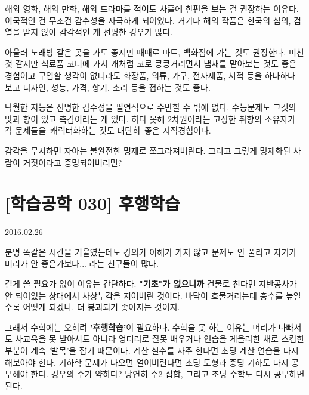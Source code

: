 해외 영화, 해외 만화, 해외 드라마를 적어도 사흘에 한편을 보는 걸 권장하는 이유다.
이국적인 건 무조건 감수성을 자극하게 되어있다. 거기다 해외 작품은 한국의 심의, 검열을 받지 않아 감각적인 게 선명한 경우가 많다.
\vspace{5mm}

아울러 노래방 같은 곳을 가도 좋지만 때때로 마트, 백화점에 가는 것도 권장한다.
미친 것 같지만 식료품 코너에 가서 개처럼 코로 킁킁거리면서 냄새를 맡아보는 것도 좋은 경험이고
구입할 생각이 없더라도 화장품, 의류, 가구, 전자제품, 서적 등을 하나하나 보고 디자인, 성능, 가격, 향기, 소리 등을 접하는 것도 좋다.
\vspace{5mm}

탁월한 지능은 선명한 감수성을 필연적으로 수반할 수 밖에 없다.
수능문제도 그것의 맛과 향이 있고 촉감이라는 게 있다.
하다 못해 2차원이라는 고상한 취향의 소유자가 각 문제들을 캐릭터화하는 것도 대단히 좋은 지적경험이다.
\vspace{5mm}

감각을 무시하면 자아는 불완전한 명제로 쪼그라져버린다.
그리고 그렇게 명제화된 사람이 거짓이라고 증명되어버리면?
\vspace{5mm}




\section{[학습공학 030] 후행학습}
\href{https://www.kockoc.com/Apoc/653080}{2016.02.26}

\vspace{5mm}

분명 똑같은 시간을 기울였는데도 강의가 이해가 가지 않고 문제도 안 풀리고
자기가 머리가 안 좋은가보다... 라는 친구들이 많다.
\vspace{5mm}

길게 쓸 필요가 없이 이유는 간단하다. \textbf{"기초"가 없으니까}
건물로 친다면 지반공사가 안 되어있는 상태에서 사상누각을 지어버린 것이다.
바닥이 흐물거리는데 층수를 높일수록 어떻게 되겠나. 더 붕괴되기 좋아지는 것이지.
\vspace{5mm}

그래서 수학에는 오히려 \textbf{'후행학습'}이 필요하다.
수학을 못 하는 이유는 머리가 나빠서도 사교육을 못 받아서도 아니라
엉터리로 잘못 배우거나 연습을 게을리한 채로 스킵한 부분이 계속 '발목'을 잡기 때문이다.
계산 실수를 자주 한다면 초딩 계산 연습을 다시 해보아야 한다.
기하학 문제가 나오면 얼어버린다면 초딩 도형과 중딩 기하도 다시 공부해야 한다.
경우의 수가 약하다? 당연히 수2 집합, 그리고 초딩 수학도 다시 공부하면 된다.
\vspace{5mm}

